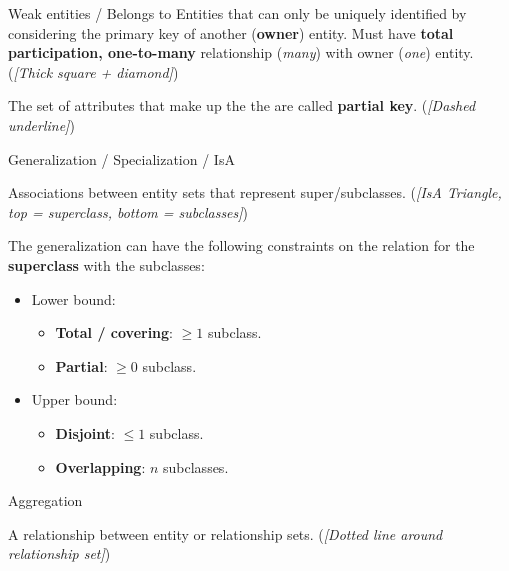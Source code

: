 \begin{definition}
    {Weak entities / Belongs to}
    Entities that can only be uniquely identified by considering the primary key of another (\textbf{owner}) entity. Must have \textbf{total participation, one-to-many} relationship (\textit{many}) with owner (\textit{one}) entity. (\textit{[Thick square + diamond]})

    The set of attributes that make up the the  are called \textbf{partial key}. (\textit{[Dashed underline]})
\end{definition}

\begin{definition}
    {Generalization / Specialization / IsA}

    Associations between entity sets that represent super/subclasses. (\textit{[IsA Triangle, top = superclass, bottom = subclasses]})

    The generalization can have the following constraints on the relation for the \textbf{superclass} with the subclasses:
    \begin{itemize}
        \item Lower bound:
              \begin{itemize}
                  \item \textbf{Total / covering}: $\geq 1$ subclass.
                  \item \textbf{Partial}: $\geq 0$ subclass.
              \end{itemize}
        \item Upper bound:
              \begin{itemize}
                  \item \textbf{Disjoint}: $\leq 1$ subclass.
                  \item \textbf{Overlapping}: $n$ subclasses.
              \end{itemize}
    \end{itemize}
\end{definition}

\begin{definition}
    {Aggregation}

    A relationship between entity or relationship sets. (\textit{[Dotted line around relationship set]})
\end{definition}